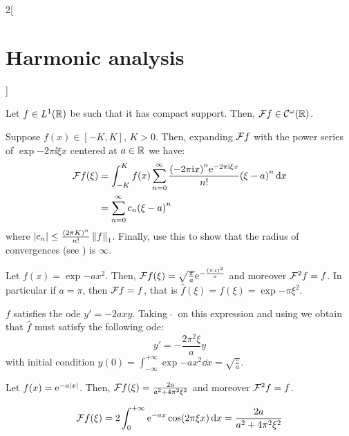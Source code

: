 \documentclass[../../../main_math.tex]{subfiles}
\begin{document}
\begin{multicols}{2}[\section{Harmonic analysis}]
\begin{proposition}
    Let $f\in L^1(\mathbb{R})$ be such that it has compact support. Then, $\mathcal{F} f\in\mathcal{C}^\omega(\mathbb{R})$.
  \end{proposition}
  \begin{sproof}
    Suppose $f(x)\in[-K,K]$, $K>0$. Then, expanding $\mathcal{F} f$ with the power series of $\exp{-2\pi\ii\xi x}$ centered at $a\in\mathbb{R}$ we have:
    \begin{align*}
      \mathcal{F} f(\xi) & =\int_{-K}^Kf(x)\sum_{n=0}^{\infty}\frac{{(-2\pi\mathrm{i} x)}^n\mathrm{e}^{-2\pi\mathrm{i} \xi x}}{n!}{(\xi-a)}^n\dd{x} \\
                & =\sum_{n=0}^\infty c_n{(\xi-a)}^n
    \end{align*}
    where $\abs{c_n}\leq\frac{{(2\pi K)}^n}{n!}\left\|f\right\|_1$. Finally, use this to show that the radius of convergences (see ) is $\infty$.
  \end{sproof}
  \begin{lemma}\label{HA:expX2}
    Let $f(x)=\exp{-a x^2}$. Then, $\mathcal{F} f(\xi)=\sqrt{\frac{\pi}{a}}\mathrm{e}^{-\frac{{(\pi x)}^2}{a}}$ and moreover $\mathcal{F}^2f=f$. In particular if $a=\pi$, then $\mathcal{F} f=f$, that is $\widehat{f}(\xi)=f(\xi)=\exp{-\pi \xi^2}$.
  \end{lemma}
  \begin{sproof}
    $f$ satisfies the ode $y'=-2a x y$. Taking $\ \widehat{}\ $ on this expression and using  we obtain that $\widehat{f}$ must satisfy the following ode:
    $$y'=-\frac{2\pi^2\xi}{a} y$$
    with initial condition $y(0)=\int_{-\infty}^{+\infty}\exp{-a x^2}\dd{x}=\sqrt{\frac{\pi}{a}}$.
  \end{sproof}
  \begin{lemma}\label{HA:expAbsX}
    Let $f(x)=\mathrm{e}^{-a\abs{x}}$. Then, $\mathcal{F} f(\xi)=\frac{2a}{a^2+4\pi^2\xi^2}$ and moreover $\mathcal{F}^2f=f$.
  \end{lemma}
  \begin{sproof}
    $$\mathcal{F} f(\xi)=2\int_0^{+\infty}\mathrm{e}^{-ax}\cos(2\pi\xi x)\dd{x}=\frac{2a}{a^2+4\pi^2\xi^2}$$
  \end{sproof}

\end{multicols}
\end{document}
